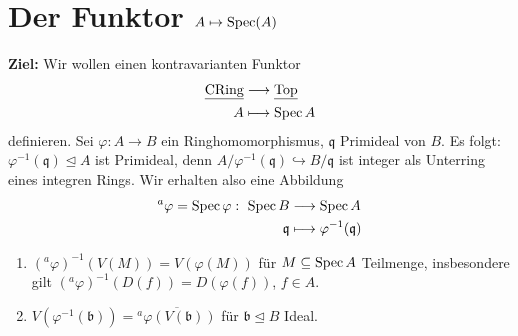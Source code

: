 \section{Der Funktor $A\protect\mapsto\text{Spec}(A)$}
\label{sec:spec-als-funktor}
\textbf{Ziel:} Wir wollen einen kontravarianten Funktor
\begin{align*}
  \text{\underline{CRing}} & \longrightarrow\text{\underline{Top}}\\
  A & \longmapsto\operatorname{Spec} A
\end{align*}
definieren. Sei $\varphi:A\longrightarrow B$ ein Ringhomomorphismus, $\mathfrak{q}$ Primideal von $B$. Es folgt:
$\varphi^{-1}(\mathfrak{q})\unlhd A$ ist Primideal, denn $A/\varphi^{-1}(\mathfrak{q})\hookrightarrow B/\mathfrak{q}$ ist integer als Unterring eines integren Rings.
Wir erhalten also eine Abbildung
\begin{align*}
  ^{a}\varphi=\operatorname{Spec}\varphi:\ \operatorname{Spec} B & \longrightarrow\operatorname{Spec} A\\
  \mathfrak{q} & \longmapsto\varphi^{-1}(\mathfrak{q})
\end{align*}

\begin{prop} \mbox{}
\label{prop:abbildungen-auf-spektren-sind-stetig}	
  \begin{enumerate}
  \item $(^{a}\varphi)^{-1}(V(M))=V(\varphi(M))$ für
    $M\subseteq\operatorname{Spec} A$ Teilmenge, insbesondere gilt
    $(^{a}\varphi)^{-1}(D(f))=D(\varphi(f))$, $f\in A$.
  \item
    $V(\varphi^{-1}(\mathfrak{b}))=\overline{^{a}\varphi(V(\mathfrak{b}))}$
    für $\mathfrak{b}\unlhd B$ Ideal.
  \end{enumerate}
\end{prop}

